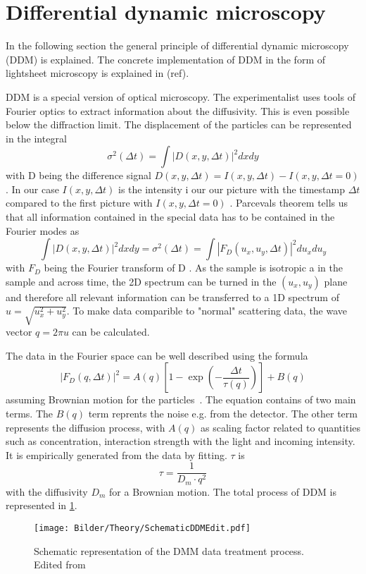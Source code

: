 \section{Differential dynamic microscopy}
\label{sec:DDM}

In the following section the general principle of differential dynamic microscopy (DDM) is explained. The concrete implementation of DDM
in the form of lightsheet microscopy is explained in (ref).

DDM is a special version of optical microscopy. The experimentalist uses tools of Fourier optics to extract information about the 
diffusivity. This is even possible below the diffraction limit. The displacement of the particles can be represented in the integral 
\begin{equation}
    \sigma^2(\Delta t) = \int |D(x,y,\Delta t)|^2 dx dy
\end{equation}
with D being the difference signal $D(x,y,\Delta t) = I(x,y,\Delta t) -I(x,y,\Delta t =0)$. In our case $I(x,y,\Delta t)$ is the intensity i our our 
picture with the timestamp $\Delta t $ compared to the first picture with $I(x,y,\Delta t = 0)$ \cite{Cerbino.2008}. Parcevals theorem tells us that all information
contained in the special data has to be contained in the Fourier modes as 
\begin{equation}
    \int |D(x,y,\Delta t)|^2 dx dy = \sigma^2(\Delta t) = \int |F_D(u_x,u_y,\Delta t)|^2 du_x du_y
\end{equation}
with $F_D$ being the Fourier transform of D \cite{Butz.2012}. As the sample is isotropic a in the sample and across time, the 2D spectrum 
can be turned in the $(u_x, u_y)$ plane and therefore all relevant information can be transferred to a 1D spectrum of $u = \sqrt{u_x^2+u_y^2}$. To make data comparible to 
"normal" scattering data, the wave vector $q = 2\pi u$ can be calculated. 

The data in the Fourier space can be well described using the formula
\begin{equation}
    |F_D(q,\Delta t)|^2 = A(q)[1- \exp(-\frac{\Delta t}{\tau (q)})] +B(q)
    \label{eq:21.3}
\end{equation}
assuming Brownian motion for the particles~\cite{Berne.2013}. The equation contains of two main terms. The $B(q)$ term reprents the 
noise e.g. from the detector. The other term represents the diffusion process, with $A(q)$ as scaling factor related to quantities such as concentration, 
interaction strength with the light and incoming intensity. It is empirically generated from the data by fitting. $\tau$ is 
\begin{equation}
    \tau = \frac{1}{D_m \cdot q^2}
    \label{eq:21.4}
\end{equation} 
with the diffusivity $D_m$ for a Brownian motion. The total process of DDM is represented in \cref{fig:DataTreatDDM}.


\begin{figure}[ht]
    \centering
    \texttt{[image: Bilder/Theory/SchematicDDMEdit.pdf]}
    \caption{Schematic representation of the DMM data treatment process. Edited from~\cite{Struntz.2017}}
    \label{fig:DataTreatDDM}
\end{figure}